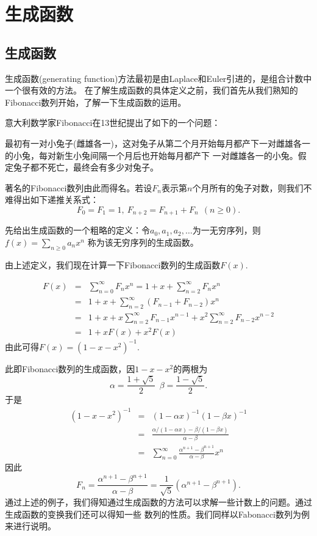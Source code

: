 \chapter{生成函数}
\label{chap1} \minitoc

\section{生成函数}
生成函数(generating function)方法最初是由Laplace和Euler引进的，是组合计数中一个很有效的方法。
在了解生成函数的具体定义之前，我们首先从我们熟知的Fibonacci数列开始，了解一下生成函数的运用。

意大利数学家Fibonacci在13世纪提出了如下的一个问题：

最初有一对小兔子(雌雄各一)，这对兔子从第二个月开始每月都产下一对雌雄各一的小兔，每对新生小兔间隔一个月后也开始每月都产下
一对雌雄各一的小兔。假定兔子都不死亡，最终会有多少对兔子。

著名的Fibonacci数列由此而得名。若设$F_n$表示第$n$个月所有的兔子对数，则我们不难得出如下递推关系式：
$$F_0=F_1=1,\ F_{n+2}=F_{n+1}+F_n\ \ (n\geq 0).$$

先给出生成函数的一个粗略的定义：令$a_0,a_1,a_2,\ldots$为一无穷序列，则
$f(x)=\sum_{n\geq0}a_nx^n$
称为该无穷序列的生成函数。


由上述定义，我们现在计算一下Fibonacci数列的生成函数$F(x).$

\begin{eqnarray*}
F(x)&=&\sum_{n=0}^{\infty}F_nx^n=1+x+\sum_{n=2}^{\infty}F_nx^n\\
&=&1+x+\sum_{n=2}^{\infty}(F_{n-1}+F_{n-2})x^n\\
&=&1+x+x\sum_{n=2}^{\infty}F_{n-1}x^{n-1}+x^2\sum_{n=2}^{\infty}F_{n-2}x^{n-2}\\
&=&1+xF(x)+x^2F(x)
\end{eqnarray*}
由此可得$F(x)=(1-x-x^2)^{-1}.$

此即Fibonacci数列的生成函数，因$1-x-x^2$的两根为
$$\alpha=\frac{1+\sqrt{5}}{2}\ \ \beta=\frac{1-\sqrt{5}}{2}.$$
于是
\begin{eqnarray*}
(1-x-x^2)^{-1}&=&(1-\alpha x)^{-1}(1-\beta x)^{-1}\\
&=&\frac{\alpha/(1-\alpha x)-\beta/(1-\beta x)}{\alpha-\beta}\\
&=&\sum_{n=0}^{\infty}\frac{\alpha^{n+1}-\beta^{n+1}}{\alpha-\beta}x^n
\end{eqnarray*}
因此
\begin{equation}
F_n=\frac{\alpha^{n+1}-\beta^{n+1}}{\alpha-\beta}=\frac{1}{\sqrt{5}}(\alpha^{n+1}-\beta^{n+1}).
\end{equation}
通过上述的例子，我们得知通过生成函数的方法可以求解一些计数上的问题。通过生成函数的变换我们还可以得知一些
数列的性质。我们同样以Fabonacci数列为例来进行说明。

